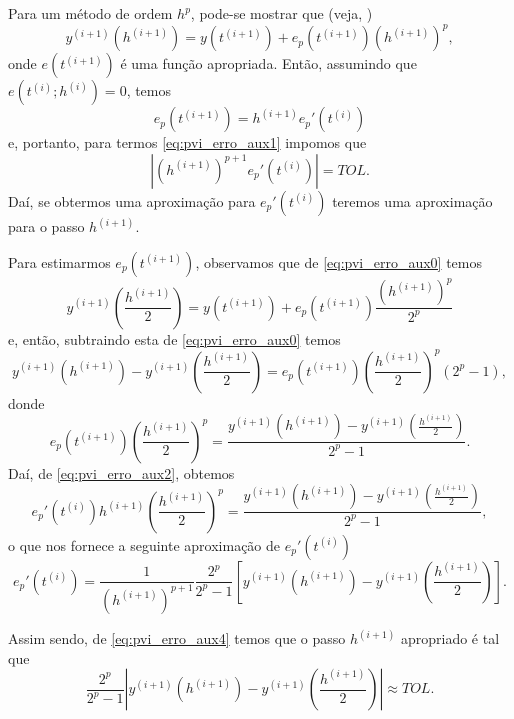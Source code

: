 Para um método de ordem $h^p$, pode-se mostrar que (veja, \cite[Cap. 7, Seç. 7.2]{Isaacson1994a})
\begin{equation}\label{eq:pvi_erro_aux0}
  y^{(i+1)}(h^{(i+1)}) = y(t^{(i+1)}) + e_p(t^{(i+1)})(h^{(i+1)})^p,
\end{equation}
onde $e(t^{(i+1)})$ é uma função apropriada. Então, assumindo que $e(t^{(i)};h^{(i)})=0$, temos
\begin{equation}\label{eq:pvi_erro_aux2}
  e_p(t^{(i+1)}) = h^{(i+1)}e_p'(t^{(i)})
\end{equation}
e, portanto, para termos \eqref{eq:pvi_erro_aux1} impomos que
\begin{equation}\label{eq:pvi_erro_aux4}
  |(h^{(i+1)})^{p+1}e_p'(t^{(i)})| = TOL.
\end{equation}
Daí, se obtermos uma aproximação para $e_p'(t^{(i)})$ teremos uma aproximação para o passo $h^{(i+1)}$.

Para estimarmos $e_p(t^{(i+1)})$, observamos que de \eqref{eq:pvi_erro_aux0} temos
\begin{equation}
  y^{(i+1)}\left(\frac{h^{(i+1)}}{2}\right) = y(t^{(i+1)}) + e_p(t^{(i+1)})\frac{(h^{(i+1)})^p}{2^p}
\end{equation}
e, então, subtraindo esta de \eqref{eq:pvi_erro_aux0} temos
\begin{equation}
  y^{(i+1)}(h^{(i+1)}) - y^{(i+1)}\left(\frac{h^{(i+1)}}{2}\right) = e_p(t^{(i+1)})\left(\frac{h^{(i+1)}}{2}\right)^p(2^p-1),
\end{equation}
donde
\begin{equation}
  e_p(t^{(i+1)})\left(\frac{h^{(i+1)}}{2}\right)^p = \frac{y^{(i+1)}(h^{(i+1)}) - y^{(i+1)}\left(\frac{h^{(i+1)}}{2}\right)}{2^p-1}.
\end{equation}
Daí, de \eqref{eq:pvi_erro_aux2}, obtemos
\begin{equation}
  e_p'(t^{(i)})h^{(i+1)}\left(\frac{h^{(i+1)}}{2}\right)^p = \frac{y^{(i+1)}(h^{(i+1)}) - y^{(i+1)}\left(\frac{h^{(i+1)}}{2}\right)}{2^p-1},
\end{equation}
o que nos fornece a seguinte aproximação de $e_p'(t^{(i)})$
\begin{equation}
  e_p'(t^{(i)}) = \frac{1}{(h^{(i+1)})^{p+1}}\frac{2^p}{2^p-1}\left[y^{(i+1)}(h^{(i+1)}) - y^{(i+1)}\left(\frac{h^{(i+1)}}{2}\right)\right].
\end{equation}

Assim sendo, de \eqref{eq:pvi_erro_aux4} temos que o passo $h^{(i+1)}$ apropriado é tal que
\begin{equation}\label{eq:pvi_passo_est}
  \frac{2^p}{2^p-1}\left|y^{(i+1)}(h^{(i+1)}) - y^{(i+1)}\left(\frac{h^{(i+1)}}{2}\right)\right| \approx TOL.
\end{equation}


